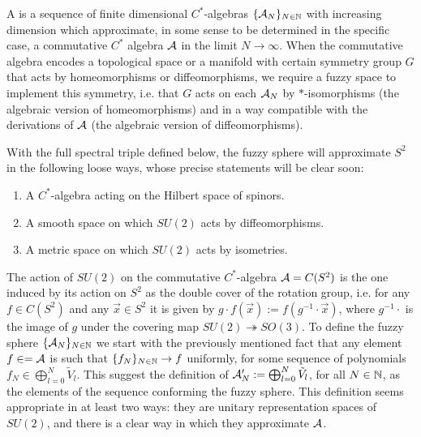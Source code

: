 A  is a sequence of finite dimensional $C^*$-algebras $\{\mathcal A_N\}_{N \in \mathbb{N}}$ with increasing dimension which approximate, in some sense to be determined in the specific case, a commutative $C^*$ algebra $\mathcal A$ in the limit $N \to \infty$. When the commutative algebra encodes a topological space or a manifold with certain symmetry group $G$ that acts by homeomorphisms or diffeomorphisms, we require a fuzzy space to implement this symmetry, i.e. that $G$ acts on each $\mathcal A_N$ by $*$-isomorphisms (the algebraic version of homeomorphisms) and in a way compatible with the derivations of $\mathcal A$ (the algebraic version of diffeomorphisms).

With the full spectral triple defined below, the fuzzy sphere will approximate $S^2$ in the following loose ways, whose precise statements will be clear soon:
    
    \begin{enumerate}
    
    \item A $C^*$-algebra acting on the Hilbert space of spinors.
    
    \item A smooth space on which $SU(2)$ acts by diffeomorphisms.
    
    \item A metric space on which $SU(2)$ acts by isometries.
    
    \end{enumerate}

\lin 

The action of $SU(2)$ on the commutative $C^*$-algebra $\mathcal A = C(S^2)$ is the one induced by its action on $S^2$ as the double cover of the rotation group, i.e. for any $f \in C(S^2)$ and any $\vec x \in S^2$ it is given by $g\cdot f(\vec x) := f(g^{-1} \cdot \vec x)$, where $g^{-1} \cdot $ is the image of $g$ under the covering map $SU(2) \twoheadrightarrow SO(3)$. To define the fuzzy sphere $\{\mathcal A_N\}_{N \in \mathbb{N}}$ we start with the 
previously mentioned fact that any element $f \in = \mathcal A$ is such that $\{f_N\}_{N \in \mathbb{N}} \to f$ uniformly, for some sequence of polynomials $f_N \in \bigoplus_{l = 0}^N \tilde V_l$. This suggest the definition of $\textcolor{black}{\mathcal A'_N} := \bigoplus_{l = 0}^N \tilde V_l$, for all $N \in \mathbb{N}$, as the elements of the sequence conforming the fuzzy sphere. This definition seems appropriate in at least two ways: they are unitary representation spaces of $SU(2)$, and there is a clear way in which they approximate $\mathcal A$.

